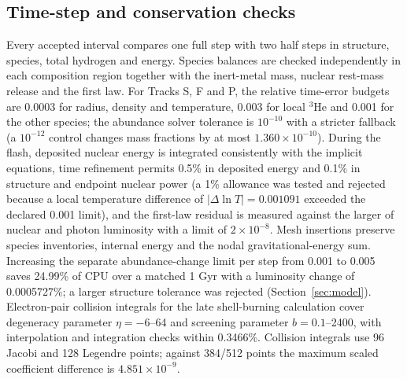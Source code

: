 \subsection*{Time-step and conservation checks}
Every accepted interval compares one full step with two half steps in
structure, species, total hydrogen and energy. Species balances are checked
independently in each composition region together with the inert-metal
mass, nuclear rest-mass release and the first law. For Tracks S, F and P, the relative time-error
budgets are 0.0003 for radius, density and temperature, 0.003 for local
$^3$He and 0.001 for the other species; the abundance solver tolerance is
$10^{-10}$ with a stricter fallback (a $10^{-12}$ control changes mass
fractions by at most $1.360\times10^{-10}$). During the flash, deposited
nuclear energy is integrated consistently with the implicit equations, time
refinement permits 0.5\% in deposited energy and 0.1\% in structure and
endpoint nuclear power (a 1\% allowance was tested and rejected because a
local temperature difference of $|\Delta\ln T|=0.001091$ exceeded the
declared 0.001 limit), and the first-law residual is measured against the
larger of nuclear and photon luminosity with a limit of $2\times10^{-8}$.
Mesh insertions preserve species inventories, internal energy and the nodal
gravitational-energy sum. Increasing the separate abundance-change limit per
step from 0.001 to 0.005 saves 24.99\% of CPU over a matched 1 Gyr with a
luminosity change of 0.0005727\%; a larger structure tolerance was rejected
(Section~\ref{sec:model}). Electron-pair collision integrals for the late
shell-burning calculation cover degeneracy parameter $\eta=-6$--64 and
screening parameter $b=0.1$--2400, with interpolation and integration checks
within 0.3466\%. Collision integrals use 96 Jacobi and 128 Legendre points;
against 384/512 points the maximum scaled coefficient difference is
$4.851\times10^{-9}$.
